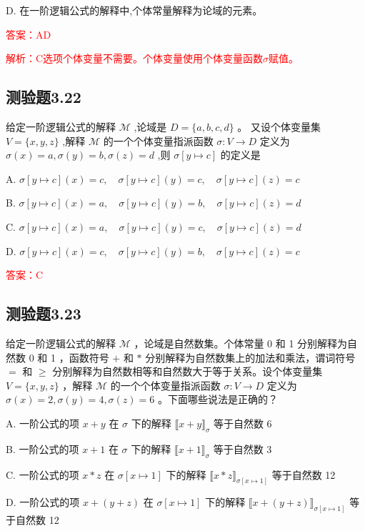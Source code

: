 \documentclass[UTF8, heading=true]{ctexart}
\begin{document}
D. 在一阶逻辑公式的解释中,个体常量解释为论域的元素。

\textcolor{red}{答案：AD}

\textcolor{red}{解析：C选项个体变量不需要。个体变量使用个体变量函数$\sigma$赋值。}

\subsection{测验题3.22}

给定一阶逻辑公式的解释 $\mathcal{M}$ ,论域是 $D=\{a, b, c, d\}$ 。 又设个体变量集 $V=\{x, y, z\}$ ,解释 $\mathcal{M}$ 的一个个体变量指派函数 $\sigma: V \rightarrow D$ 定义为 $\sigma(x)=a, \sigma(y)=b, \sigma(z)=d$ ,则 $\sigma[y \mapsto c]$ 的定义是 $\qquad$

A. $\sigma[y \mapsto c](x)=c, \quad \sigma[y \mapsto c](y)=c, \quad \sigma[y \mapsto c](z)=c$

B. $\sigma[y \mapsto c](x)=a, \quad \sigma[y \mapsto c](y)=b, \quad \sigma[y \mapsto c](z)=d$ 

C. $\sigma[y \mapsto c](x)=a, \quad \sigma[y \mapsto c](y)=c, \quad \sigma[y \mapsto c](z)=d$ 

D. $\sigma[y \mapsto c](x)=c, \quad \sigma[y \mapsto c](y)=b, \quad \sigma[y \mapsto c](z)=c$

\textcolor{red}{答案：C}

\subsection{测验题3.23}

给定一阶逻辑公式的解释 $\mathcal{M}$ ，论域是自然数集。个体常量 0 和 1 分别解释为自然数 0 和 1 ，函数符号 $+$ 和 $*$ 分别解释为自然数集上的加法和乘法，谓词符号 $=$ 和 $\geq$ 分别解释为自然数相等和自然数大于等于关系。设个体变量集 $V=\{x, y, z\}$ ，解释 $\mathcal{M}$ 的一个个体变量指派函数 $\sigma: V \rightarrow D$ 定义为 $\sigma(x)=2, \sigma(y)=4, \sigma(z)=6$ 。下面哪些说法是正确的？

A. 一阶公式的项 $x+y$ 在 $\sigma$ 下的解释 $\llbracket x+y \rrbracket_\sigma$ 等于自然数 6

B. 一阶公式的项 $x+1$ 在 $\sigma$ 下的解释 $\llbracket x+1 \rrbracket_\sigma$ 等于自然数 3

C. 一阶公式的项 $x * z$ 在 $\sigma[x \mapsto 1]$ 下的解释 $\llbracket x * z \rrbracket_{\sigma[x \mapsto 1]}$ 等于自然数 12

D. 一阶公式的项 $x+(y+z)$ 在 $\sigma[x \mapsto 1]$ 下的解释 $\llbracket x+(y+z) \rrbracket_{\sigma[x \mapsto 1]}$ 等于自然数 12
\end{document}

